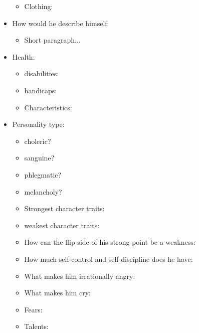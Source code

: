 \documentclass[openleft,oneside,showtrims]{memoir}
\begin{document}
\begin{itemize}
\begin{itemize}
\item Clothing:
\end{itemize}

\item How would he describe himself:
\label{sec:org585cb4d}

\begin{itemize}
\item Short paragraph...
\end{itemize}

\item Health:
\label{sec:org9b95044}

\begin{itemize}
\item disabilities:

\item handicaps:

\item Characteristics:
\end{itemize}

\item Personality type:
\label{sec:org3f4e787}

\begin{itemize}
\item choleric?

\item sanguine?

\item phlegmatic?

\item melancholy?

\item Strongest character traits:

\item weakest character traits:

\item How can the flip side of his strong point be a weakness:

\item How much self-control and self-discipline does he have:

\item What makes him irrationally angry:

\item What makes him cry:

\item Fears:

\item Talents:
\end{itemize}


\end{itemize}
\end{document}
